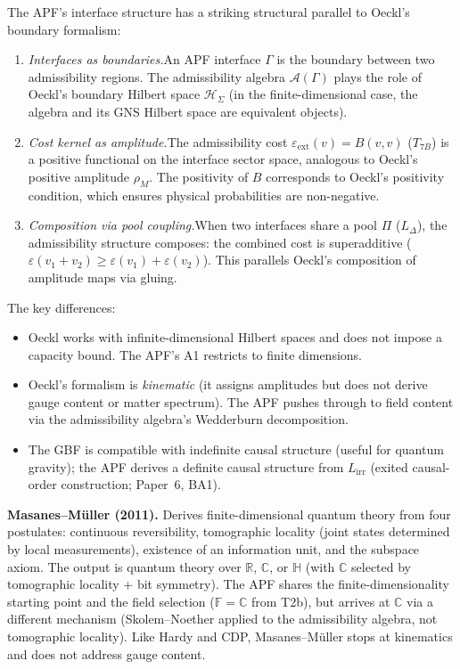 \documentclass[11pt]{article}
\theoremstyle{definition}
\begin{document}
The APF's interface structure has a striking structural parallel to
Oeckl's boundary formalism:
\begin{enumerate}[label=(\alph*),nosep]
  \item \textit{Interfaces as boundaries.}\quad An APF interface
  $\Gamma$ is the boundary between two admissibility regions.  The
  admissibility algebra $\mathcal{A}(\Gamma)$ plays the role of
  Oeckl's boundary Hilbert space $\mathcal{H}_\Sigma$ (in the
  finite-dimensional case, the algebra and its GNS Hilbert space
  are equivalent objects).
  \item \textit{Cost kernel as amplitude.}\quad The admissibility cost
  $\varepsilon_{\mathrm{ext}}(v) = B(v,v)$ ($T_{7B}$) is a positive
  functional on the interface sector space, analogous to Oeckl's
  positive amplitude $\rho_M$.  The positivity of $B$ corresponds to
  Oeckl's positivity condition, which ensures physical probabilities
  are non-negative.
  \item \textit{Composition via pool coupling.}\quad When two
  interfaces share a pool $\Pi$ ($L_\Delta$), the admissibility
  structure composes: the combined cost is superadditive
  ($\varepsilon(v_1 + v_2) \ge \varepsilon(v_1) + \varepsilon(v_2)$).
  This parallels Oeckl's composition of amplitude maps via gluing.
\end{enumerate}
The key differences:
\begin{itemize}[nosep]
  \item Oeckl works with infinite-dimensional Hilbert spaces and
  does not impose a capacity bound.  The APF's A1 restricts to finite
  dimensions.
  \item Oeckl's formalism is \emph{kinematic} (it assigns amplitudes
  but does not derive gauge content or matter spectrum).  The APF
  pushes through to field content via the admissibility algebra's
  Wedderburn decomposition.
  \item The GBF is compatible with indefinite causal structure
  (useful for quantum gravity); the APF derives a definite causal
  structure from $L_{\mathrm{irr}}$
  (exited causal-order construction; Paper~6, BA1).
\end{itemize}

\smallskip\noindent\textbf{Masanes--M\"uller (2011).}\quad
Derives finite-dimensional quantum theory from four postulates:
continuous reversibility, tomographic locality (joint states
determined by local measurements), existence of an information unit,
and the subspace axiom.  The output is quantum theory over
$\mathbb{R}$, $\mathbb{C}$, or $\mathbb{H}$ (with $\mathbb{C}$
selected by tomographic locality + bit symmetry).  The APF shares
the finite-dimensionality starting point and the field selection
($\mathbb{F} = \mathbb{C}$ from T2b), but arrives at $\mathbb{C}$
via a different mechanism (Skolem--Noether applied to the admissibility
algebra, not tomographic locality).  Like Hardy and CDP,
Masanes--M\"uller stops at kinematics and does not address gauge
content.
\end{document}
